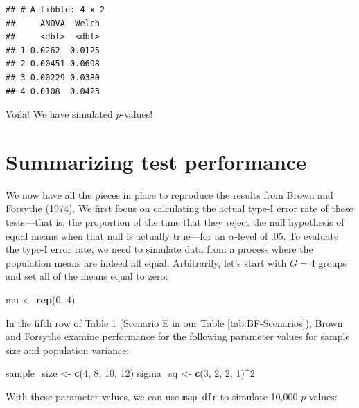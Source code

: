 \documentclass[
]{book}
\newenvironment{Shaded}{\begin{snugshade}}{\end{snugshade}}
\newcommand{\DecValTok}[1]{\textcolor[rgb]{0.00,0.00,0.81}{#1}}
\newcommand{\FunctionTok}[1]{\textcolor[rgb]{0.13,0.29,0.53}{\textbf{#1}}}
\newcommand{\NormalTok}[1]{#1}
\newcommand{\OtherTok}[1]{\textcolor[rgb]{0.56,0.35,0.01}{#1}}
\newcommand{\SpecialCharTok}[1]{\textcolor[rgb]{0.81,0.36,0.00}{\textbf{#1}}}
\begin{document}
\begin{verbatim}
## # A tibble: 4 x 2
##     ANOVA  Welch
##     <dbl>  <dbl>
## 1 0.0262  0.0125
## 2 0.00451 0.0698
## 3 0.00229 0.0380
## 4 0.0108  0.0423
\end{verbatim}

Voila! We have simulated \(p\)-values!

\section{Summarizing test performance}\label{summarizing-test-performance}

We now have all the pieces in place to reproduce the results from Brown and Forsythe (1974).
We first focus on calculating the actual type-I error rate of these tests---that is, the proportion of the time that they reject the null hypothesis of equal means when that null is actually true---for an \(\alpha\)-level of .05.
To evaluate the type-I error rate, we need to simulate data from a process where the population means are indeed all equal.
Arbitrarily, let's start with \(G = 4\) groups and set all of the means equal to zero:

\begin{Shaded}
\begin{Highlighting}[]
\NormalTok{mu }\OtherTok{\textless{}{-}} \FunctionTok{rep}\NormalTok{(}\DecValTok{0}\NormalTok{, }\DecValTok{4}\NormalTok{)}
\end{Highlighting}
\end{Shaded}

In the fifth row of Table 1 (Scenario E in our Table \ref{tab:BF-Scenarios}), Brown and Forsythe examine performance for the following parameter values for sample size and population variance:

\begin{Shaded}
\begin{Highlighting}[]
\NormalTok{sample\_size }\OtherTok{\textless{}{-}} \FunctionTok{c}\NormalTok{(}\DecValTok{4}\NormalTok{, }\DecValTok{8}\NormalTok{, }\DecValTok{10}\NormalTok{, }\DecValTok{12}\NormalTok{)}
\NormalTok{sigma\_sq }\OtherTok{\textless{}{-}} \FunctionTok{c}\NormalTok{(}\DecValTok{3}\NormalTok{, }\DecValTok{2}\NormalTok{, }\DecValTok{2}\NormalTok{, }\DecValTok{1}\NormalTok{)}\SpecialCharTok{\^{}}\DecValTok{2}
\end{Highlighting}
\end{Shaded}

With these parameter values, we can use \texttt{map\_dfr} to simulate 10,000 \(p\)-values:
\end{document}
